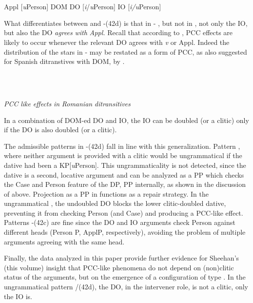 \documentclass[output=paper,colorlinks,citecolor=brown]{./langscibook}
\begin{document}
\ea%
    \label{ex:key:43}
    \gll\\
        \\
    \glt
    \z

          Appl [\textit{u}Person]  DOM DO [\textit{i}/\textit{u}Person]  IO [\textit{i/u}Person]

What differentiates between  and -(42d) is that in - , but not in , not only the IO, but also the DO \textit{agrees} \textit{with} \textit{Appl.} Recall that according to \citet{Preminger2017}, PCC effects are likely to occur whenever the relevant DO agrees with \textit{v} or Appl. Indeed the distribution of the stars in -  may be restated as a form of PCC, as also suggested for Spanish ditranstives with DOM, by \citet{OrmazabalRomero2013Probus}.

\ea%
    \label{ex:key:44}
    \gll\\
        \\
    \glt
    \z

          \textit{PCC} \textit{like} \textit{effects} \textit{in} \textit{Romanian} \textit{ditransitives}

In a combination of DOM-ed DO and IO, the IO can be doubled (or a clitic) only if the DO is also doubled (or a clitic). 

The admissible patterns in -(42d) fall in line with this generalization. Pattern , where neither argument is provided with a clitic would be ungrammatical if the dative had been a KP[\textit{u}Person]. This ungrammaticality is not detected, since the dative is a second, locative argument and can be analyzed as a PP which checks the Case and Person feature of the DP, PP internally, as shown in the discussion of  above. Projection as a PP in  functions as a repair strategy. In the ungrammatical , the undoubled DO blocks the lower clitic-doubled dative, preventing it from checking Person (and Case) and producing a PCC-like effect. Patterns -(42c) are fine since the DO and IO arguments check Person against different heads (Person P, ApplP, respectively), avoiding the problem of multiple arguments agreeing with the same head.

Finally, the data analyzed in this paper provide further evidence for Sheehan’s (this volume) insight that PCC-like phenomena do not depend on (non)clitic status of the arguments, but on the emergence of a configuration of type . In the ungrammatical pattern /(42d), the DO, in the intervener role, is not a clitic, only the IO is.
\end{document}
